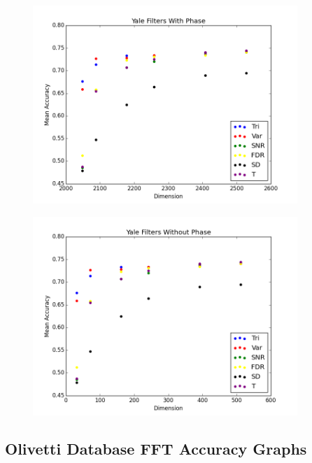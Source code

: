 \documentclass[12pt, letterpaper]{article}
\begin{document}
\begin{center}
	\begin{figure}[H]
		\centering
		\includegraphics[width=10cm, keepaspectratio]{fftAcc/y_filters_phase_1}
		\label{fig:gfypt}
	\end{figure}
\end{center}

\begin{center}
	\begin{figure}[H]
		\centering
		\includegraphics[width=10cm, keepaspectratio]{fftAcc/y_filters_nophase_1}
		\label{fig:gfyopt}
	\end{figure}
\end{center}

\clearpage

\subsection{Olivetti Database FFT Accuracy Graphs}
\end{document}
